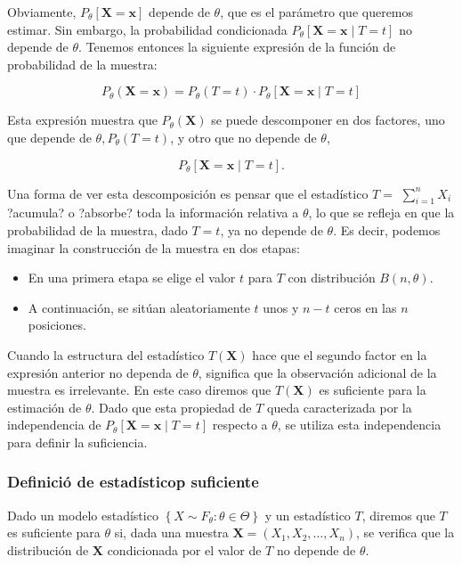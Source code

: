 \documentclass[
]{article}
\providecommand{\tightlist}{%
  \setlength{\itemsep}{0pt}\setlength{\parskip}{0pt}}
\begin{document}
Obviamente, \(P_{\theta}[\mathbf{X}=\mathbf{x}]\) depende de \(\theta\), que es el parámetro que queremos estimar. Sin embargo, la probabilidad condicionada \(P_{\theta}[\mathbf{X}=\mathbf{x} \mid T=t]\) no depende de \(\theta\). Tenemos entonces la siguiente expresión de la función de probabilidad de la muestra:

\[
P_{\theta}(\mathbf{X}=\mathbf{x})=P_{\theta}(T=t) \cdot P_{\theta}[\mathbf{X}=\mathbf{x} \mid T=t]
\]

Esta expresión muestra que \(P_{\theta}(\mathbf{X})\) se puede descomponer en dos factores, uno que depende de \(\theta, P_{\theta}(T=t)\), y otro que no depende de \(\theta\),

\[
P_{\theta}[\mathbf{X}=\mathbf{x} \mid T=t] .
\]

Una forma de ver esta descomposición es pensar que el estadístico \(T=\) \(\sum_{i=1}^{n} X_{i}\) ?acumula? o ?absorbe? toda la información relativa a \(\theta\), lo que se refleja en que la probabilidad de la muestra, dado \(T=t\), ya no depende de \(\theta\). Es decir, podemos imaginar la construcción de la muestra en dos etapas:

\begin{itemize}
\tightlist
\item
  En una primera etapa se elige el valor \(t\) para \(T\) con distribución \(B(n, \theta)\).
\item
  A continuación, se sitúan aleatoriamente \(t\) unos y \(n-t\) ceros en las \(n\) posiciones.
\end{itemize}

Cuando la estructura del estadístico \(T(\mathbf{X})\) hace que el segundo factor en la expresión anterior no dependa de \(\theta\), significa que la observación adicional de la muestra es irrelevante. En este caso diremos que \(T(\mathbf{X})\) es suficiente para la estimación de \(\theta\). Dado que esta propiedad de \(T\) queda caracterizada por la independencia de \(P_{\theta}[\mathbf{X}=\mathbf{x} \mid T=t]\) respecto a \(\theta\), se utiliza esta independencia para definir la suficiencia.

\subsubsection{Definició de estadísticop suficiente}\label{definiciuxf3-de-estaduxedsticop-suficiente}

Dado un modelo estadístico \(\left\{X \sim F_{\theta}: \theta \in \Theta\right\}\) y un estadístico \(T\), diremos que \(T\) es suficiente para \(\theta\) si, dada una muestra \(\mathbf{X}=\left(X_{1}, X_{2}, \ldots, X_{n}\right)\), se verifica que la distribución de \(\mathbf{X}\) condicionada por el valor de \(T\) no depende de \(\theta\).
\end{document}
